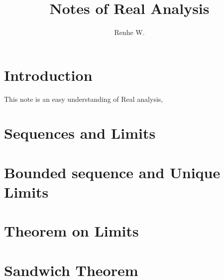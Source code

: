 \documentclass[UTF8,12pt]{ctexart}
\title{Notes of Real Analysis}
\author{Renhe W.}
\date{ }
\numberwithin{equation}{section}%
\begin{document}
	\maketitle
	\tableofcontents
	
	\section{Introduction}
	This note is an easy understanding of Real analysis, 
	
	\section{Sequences and Limits}
	
	\section{Bounded sequence and Unique Limits}
	
	\section{Theorem on Limits}
	
	\section{Sandwich Theorem}
	
\end{document}

